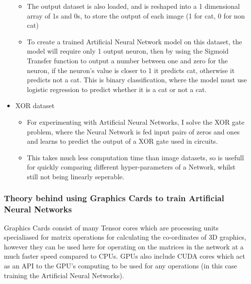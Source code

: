 \documentclass[./project-report/src/latex/project-report.tex]{subfiles}
\begin{document}
\begin{itemize}
\begin{itemize}
        \item The output dataset is also loaded, and is reshaped into a 1 dimensional array of 1s and 0s, to store the output of each image (1 for cat, 0 for non cat)
        \item To create a trained Artificial Neural Network model on this dataset, the model will require only 1 output neuron, then by using the Sigmoid Transfer 
              function to output a number between one and zero for the neuron, if the neuron's value is closer to 1 it predicts cat, otherwise it predicts not a cat. 
              This is binary classification, where the model must use logistic regression to predict whether it is a cat or not a cat.
    \end{itemize}
    \item XOR dataset
    \begin{itemize}
        \item For experimenting with Artificial Neural Networks, I solve the XOR gate problem, where the Neural Network is fed input pairs of zeros and ones and learns 
              to predict the output of a XOR gate used in circuits.
        \item This takes much less computation time than image datasets, so is usefull for quickly comparing different hyper-parameters of a Network, whilst still 
              not being linearly seperable.
    \end{itemize}
\end{itemize}

\subsubsection{Theory behind using Graphics Cards to train Artificial Neural Networks}
\vspace{5mm}

Graphics Cards consist of many Tensor cores which are processing units specialiased for matrix operations for calculating the co-ordinates of 3D graphics, however they 
can be used here for operating on the matrices in the network at a much faster speed compared to CPUs. GPUs also include CUDA cores which act as an API to the GPU's 
computing to be used for any operations (in this case training the Artificial Neural Networks).

\pagebreak
\end{document}
